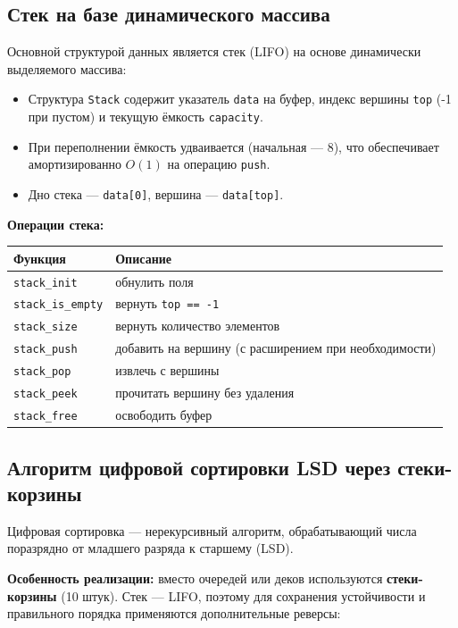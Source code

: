 \documentclass[a4paper,14pt]{extarticle}
\begin{document}
\subsection{Стек на базе динамического массива}

Основной структурой данных является стек (LIFO) на основе динамически выделяемого массива:

\begin{itemize}
  \item Структура \texttt{Stack} содержит указатель \texttt{data} на буфер, индекс вершины \texttt{top} (-1 при пустом) и текущую ёмкость \texttt{capacity}.
  \item При переполнении ёмкость удваивается (начальная — 8), что обеспечивает амортизированно $O(1)$ на операцию \texttt{push}.
  \item Дно стека — \texttt{data[0]}, вершина — \texttt{data[top]}.
\end{itemize}

\textbf{Операции стека:}

\begin{center}
\begin{tabular}{|l|l|}
\hline
\textbf{Функция} & \textbf{Описание} \\
\hline
\texttt{stack\_init}      & обнулить поля \\
\hline
\texttt{stack\_is\_empty} & вернуть \texttt{top == -1} \\
\hline
\texttt{stack\_size}      & вернуть количество элементов \\
\hline
\texttt{stack\_push}      & добавить на вершину (с расширением при необходимости) \\
\hline
\texttt{stack\_pop}       & извлечь с вершины \\
\hline
\texttt{stack\_peek}      & прочитать вершину без удаления \\
\hline
\texttt{stack\_free}      & освободить буфер \\
\hline
\end{tabular}
\end{center}

\subsection{Алгоритм цифровой сортировки LSD через стеки-корзины}

Цифровая сортировка — нерекурсивный алгоритм, обрабатывающий числа поразрядно от младшего разряда к старшему (LSD).

\textbf{Особенность реализации:} вместо очередей или деков используются \textbf{стеки-корзины} (10 штук). Стек — LIFO, поэтому для сохранения устойчивости и правильного порядка применяются дополнительные реверсы:
\end{document}

